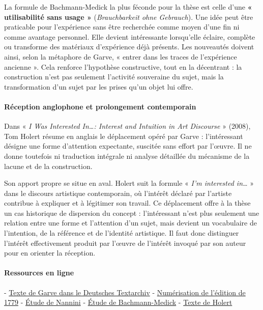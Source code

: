 \documentclass[10pt,a4paper]{article}
\begin{document}
La formule de Bachmann-Medick la plus féconde pour la thèse est celle d'une \textbf{« utilisabilité sans usage »} (\emph{Brauchbarkeit ohne Gebrauch}). Une idée peut être praticable pour l'expérience sans être recherchée comme moyen d'une fin ni comme avantage personnel. Elle devient intéressante lorsqu'elle éclaire, complète ou transforme des matériaux d'expérience déjà présents. Les nouveautés doivent ainsi, selon la métaphore de Garve, « entrer dans les traces de l'expérience ancienne ». Cela renforce l'hypothèse constructive, tout en la décentrant : la construction n'est pas seulement l'activité souveraine du sujet, mais la transformation d'un sujet par les prises qu'un objet lui offre.

\paragraph{Réception anglophone et prolongement contemporain}
Dans « \emph{I Was Interested In…: Interest and Intuition in Art Discourse} » (2008), Tom Holert résume en anglais le déplacement opéré par Garve : l'intéressant désigne une forme d'attention expectante, suscitée sans effort par l'œuvre. Il ne donne toutefois ni traduction intégrale ni analyse détaillée du mécanisme de la lacune et de la construction.

Son apport propre se situe en aval. Holert suit la formule « \emph{I'm interested in…} » dans le discours artistique contemporain, où l'intérêt déclaré par l'artiste contribue à expliquer et à légitimer son travail. Ce déplacement offre à la thèse un cas historique de dispersion du concept : l'intéressant n'est plus seulement une relation entre une forme et l'attention d'un sujet, mais devient un vocabulaire de l'intention, de la référence et de l'identité artistique. Il faut donc distinguer l'intérêt effectivement produit par l'œuvre de l'intérêt invoqué par son auteur pour en orienter la réception.

\paragraph{Ressources en ligne}
- \href{\detokenize{https://www.deutschestextarchiv.de/book/show/garve_sammlung_1779}}{Texte de Garve dans le Deutsches Textarchiv} - \href{\detokenize{https://opendata.uni-halle.de/handle/1981185920/97616}}{Numérisation de l'édition de 1779} - \href{\detokenize{https://mimesisjournals.com/ojs/index.php/aesthetica-preprint/issue/download/8/9}}{Étude de Nannini} - \href{\detokenize{https://bachmann-medick.de/wp-content/uploads/2006/07/Garve-Interessierendes2.pdf}}{Étude de Bachmann-Medick} - \href{\detokenize{https://frontdeskapparatus.com/wp/wp-content/uploads/2012/10/TH.pdf}}{Texte de Holert}
\end{document}
